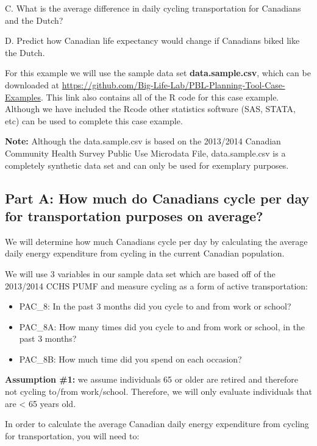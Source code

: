 \documentclass[]{book}
\providecommand{\tightlist}{%
  \setlength{\itemsep}{0pt}\setlength{\parskip}{0pt}}
\begin{document}
C. What is the average difference in daily cycling transportation for
Canadians and the Dutch?

D. Predict how Canadian life expectancy would change if Canadians biked
like the Dutch.

For this example we will use the sample data set
\textbf{data.sample.csv}, which can be downloaded at
\url{https://github.com/Big-Life-Lab/PBL-Planning-Tool-Case-Examples}.
This link also contains all of the R code for this case example.
Although we have included the Rcode other statistics software (SAS,
STATA, etc) can be used to complete this case example.

\textbf{Note:} Although the data.sample.csv is based on the 2013/2014
Canadian Community Health Survey Public Use Microdata File,
data.sample.csv is a completely synthetic data set and can only be used
for exemplary purposes.

\subsection{Part A: How much do Canadians cycle per day for
transportation purposes on
average?}\label{part-a-how-much-do-canadians-cycle-per-day-for-transportation-purposes-on-average}

We will determine how much Canadians cycle per day by calculating the
average daily energy expenditure from cycling in the current Canadian
population.

We will use 3 variables in our sample data set which are based off of
the 2013/2014 CCHS PUMF and measure cycling as a form of active
transportation:

\begin{itemize}
\tightlist
\item
  PAC\_8: In the past 3 months did you cycle to and from work or school?
\item
  PAC\_8A: How many times did you cycle to and from work or school, in
  the past 3 months?
\item
  PAC\_8B: How much time did you spend on each occasion?
\end{itemize}

\textbf{Assumption \#1:} we assume individuals 65 or older are retired
and therefore not cycling to/from work/school. Therefore, we will only
evaluate individuals that are \textless{} 65 years old.

In order to calculate the average Canadian daily energy expenditure from
cycling for transportation, you will need to:
\end{document}

